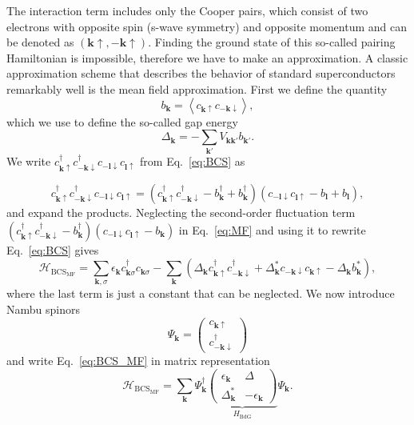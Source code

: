 The interaction term includes only the Cooper pairs, which consist of two electrons with opposite spin (s-wave symmetry) and opposite momentum and can be denoted as $(\bm{\bm{k}}\uparrow,-\bm{k}\uparrow)$.
Finding the ground state of this so-called pairing Hamiltonian is impossible, therefore we have to make an approximation.
A classic approximation scheme that describes the behavior of standard superconductors remarkably well is the mean field approximation.
First we define the quantity
\[
b_{\bm{k}}=\left\langle c_{\bm{k}\uparrow}c_{-\bm{k}\downarrow}\right\rangle ,
\]
which we use to define the so-called gap energy
\[
\Delta_{\bm{k}}=-\sum_{\bm{k'}}V_{\bm{kk'}}b_{\bm{k'}}.
\]
We write $c_{\bm{k}\uparrow}^{\dagger}c_{-\bm{k}\downarrow}^{\dagger}c_{-\bm{l}\downarrow}c_{\bm{l}\uparrow}$ from Eq.~\ref{eq:BCS} as

\begin{equation}
c_{\bm{k}\uparrow}^{\dagger}c_{-\bm{k}\downarrow}^{\dagger}c_{-\bm{l}\downarrow}c_{\bm{l}\uparrow}=\left(c_{\bm{k}\uparrow}^{\dagger}c_{-\bm{k}\downarrow}^{\dagger}-b_{\bm{k}}^{\dagger}+b_{\bm{k}}^{\dagger}\right)\left(c_{-\bm{l}\downarrow}c_{\bm{l}\uparrow}-b_{\bm{l}}+b_{\bm{l}}\right),\label{eq:MF}
\end{equation}
and expand the products.
Neglecting the second-order fluctuation term  $\left(c_{\bm{k}\uparrow}^{\dagger}c_{-\bm{k}\downarrow}^{\dagger}-b_{\bm{k}}^{\dagger}\right)\left(c_{-\bm{l}\downarrow}c_{\bm{l}\uparrow}-b_{\bm{k}}\right)$ in Eq.~\ref{eq:MF} and using it to rewrite Eq.~\ref{eq:BCS} gives
\begin{equation}
\mathcal{H}_{\textrm{BCS}_{\textrm{MF}}}=\underset{\bm{k},\sigma}{\sum}\epsilon_{\bm{k}}c_{\bm{k}\sigma}^{\dagger}c_{\bm{k}\sigma}-\underset{\bm{k}}{\sum}\left(\Delta_{\bm{k}}c_{\bm{k}\uparrow}^{\dagger}c_{-\bm{k}\downarrow}^{\dagger}+\Delta_{\bm{k}}^{*}c_{-\bm{k}\downarrow}c_{\bm{k}\uparrow}-\Delta_{\bm{k}}b_{\bm{k}}^{*}\right),\label{eq:BCS_MF}
\end{equation}
where the last term is just a constant that can be neglected.
We now introduce Nambu spinors
\begin{equation}
\Psi_{\bm{k}}=\left(\begin{array}{c}
c_{\bm{k}\uparrow}\\
c_{-\bm{k}\downarrow}^{\dagger}
\end{array}\right)\label{eq:Nambu}
\end{equation}
and write Eq.~\ref{eq:BCS_MF} in matrix representation
\[
\mathcal{H}_{\textrm{BCS}_{\textrm{MF}}}=\underset{\bm{k}}{\sum}\Psi_{\bm{k}}^{\dagger}\underset{H_{\textrm{BdG}}}{\underbrace{\left(\begin{array}{cc}
\epsilon_{\bm{k}} & \Delta\\
\Delta_{\bm{k}}^{*} & -\epsilon_{\bm{k}}
\end{array}\right)}}\Psi_{\bm{k}}.
\]
